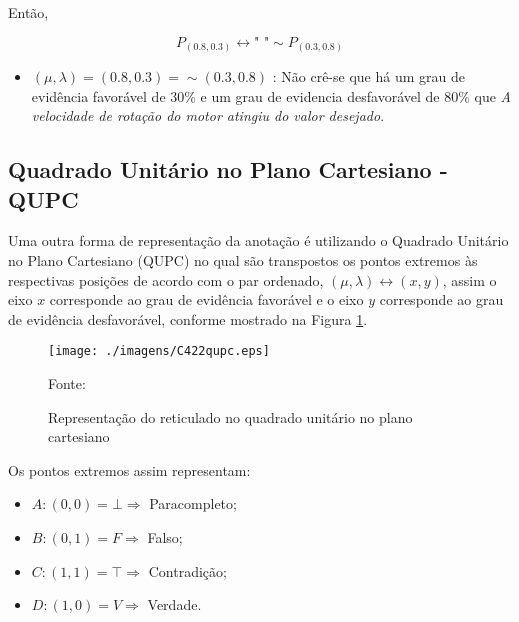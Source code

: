Então,
\begin{center}
\begin{equation}
P_{(0.8,0.3)} \leftrightarrow \textrm{"   "} \sim P_{(0.3,0.8)}
\end{equation}
\end{center}

\begin{itemize}
\item 
$(\mu, \lambda ) = (0.8,0.3) = \sim (0.3,0.8)$ : Não crê-se que há um grau de evidência favorável de 30\% e um grau de evidencia desfavorável de 80\% que \emph{A velocidade de rotação do motor atingiu do valor desejado}.
\end{itemize}



\subsection{Quadrado Unitário no Plano Cartesiano - QUPC}

Uma outra forma de representação da anotação é utilizando o Quadrado Unitário no Plano Cartesiano (QUPC) no qual são transpostos os pontos extremos às respectivas posições de acordo com o par ordenado,  $(\mu, \lambda ) \leftrightarrow (x,y) $, assim o eixo $x$ corresponde ao grau de evidência favorável e o eixo $y$ corresponde ao grau de evidência desfavorável, conforme mostrado na Figura \ref{fig:reticuladoQUPC}.



\begin{figure}[!htb]
\caption{Representação do reticulado no quadrado unitário no plano cartesiano}
\center\texttt{[image: ./imagens/C422qupc.eps]}
\label{fig:reticuladoQUPC}

{\small Fonte: \cite{JoaoInacio} }
\end{figure}

Os pontos extremos assim representam:

\begin{itemize}
\item $A: (0,0) = \bot \Rightarrow $ Paracompleto;
\item $B: (0,1) = F \Rightarrow $ Falso;
\item $C: (1,1) = \top \Rightarrow $ Contradição;
\item $D: (1,0) = V \Rightarrow $ Verdade.
\end{itemize}

